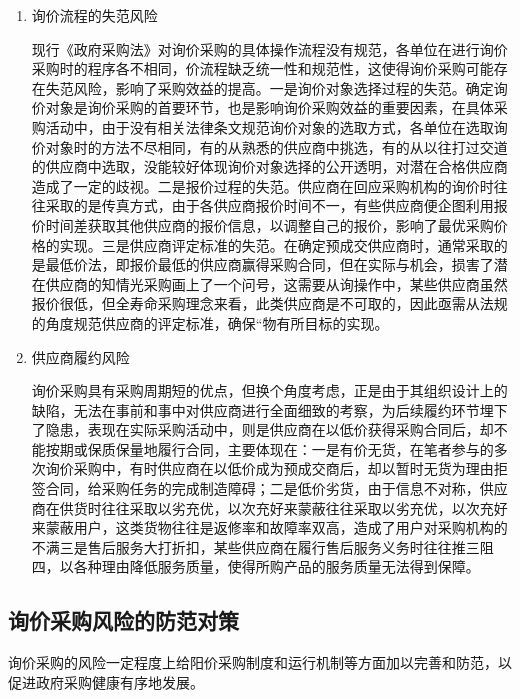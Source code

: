 \begin{enumerate}
    \item  询价流程的失范风险

        现行《政府采购法》对询价采购的具体操作流程没有规范，各单位在进行询价采购时的程序各不相同，价流程缺乏统一性和规范性，这使得询价采购可能存在失范风险，影响了采购效益的提高。一是询价对象选择过程的失范。确定询价对象是询价采购的首要环节，也是影响询价采购效益的重要因素，在具体采购活动中，由于没有相关法律条文规范询价对象的选取方式，各单位在选取询价对象时的方法不尽相同，有的从熟悉的供应商中挑选，有的从以往打过交道的供应商中选取，没能较好体现询价对象选择的公开透明，对潜在合格供应商造成了一定的歧视。二是报价过程的失范。供应商在回应采购机构的询价时往往采取的是传真方式，由于各供应商报价时间不一，有些供应商便企图利用报价时间差获取其他供应商的报价信息，以调整自己的报价，影响了最优采购价格的实现。三是供应商评定标准的失范。在确定预成交供应商时，通常采取的是最低价法，即报价最低的供应商赢得采购合同，但在实际与机会，损害了潜在供应商的知情光采购画上了一个问号，这需要从询操作中，某些供应商虽然报价很低，但全寿命采购理念来看，此类供应商是不可取的，因此亟需从法规的角度规范供应商的评定标准，确保“物有所目标的实现。

    \item  供应商履约风险

        询价采购具有采购周期短的优点，但换个角度考虑，正是由于其组织设计上的缺陷，无法在事前和事中对供应商进行全面细致的考察，为后续履约环节埋下了隐患，表现在实际采购活动中，则是供应商在以低价获得采购合同后，却不能按期或保质保量地履行合同，主要体现在：一是有价无货，在笔者参与的多次询价采购中，有时供应商在以低价成为预成交商后，却以暂时无货为理由拒签合同，给采购任务的完成制造障碍；二是低价劣货，由于信息不对称，供应商在供货时往往采取以劣充优，以次充好来蒙蔽往往采取以劣充优，以次充好来蒙蔽用户，这类货物往往是返修率和故障率双高，造成了用户对采购机构的不满三是售后服务大打折扣，某些供应商在履行售后服务义务时往往推三阻四，以各种理由降低服务质量，使得所购产品的服务质量无法得到保障。

    \end{enumerate}

\subsection {询价采购风险的防范对策}

        询价采购的风险一定程度上给阳价采购制度和运行机制等方面加以完善和防范，以促进政府采购健康有序地发展。


